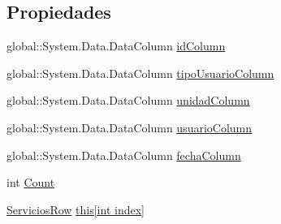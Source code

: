 \subsection*{Propiedades}
\begin{DoxyCompactItemize}
\item 
global\-::\-System.\-Data.\-Data\-Column \hyperlink{class_proyecto___integrador__3_1_1ds_servicios_1_1_servicios_data_table_a238b98b486c4eb6077f5eb1d26596f26}{id\-Column}
\item 
global\-::\-System.\-Data.\-Data\-Column \hyperlink{class_proyecto___integrador__3_1_1ds_servicios_1_1_servicios_data_table_a3ce967e456559fdf973c0efc3b70df96}{tipo\-Usuario\-Column}
\item 
global\-::\-System.\-Data.\-Data\-Column \hyperlink{class_proyecto___integrador__3_1_1ds_servicios_1_1_servicios_data_table_ab0e7d5e73c91967ce47805cbefda5db3}{unidad\-Column}
\item 
global\-::\-System.\-Data.\-Data\-Column \hyperlink{class_proyecto___integrador__3_1_1ds_servicios_1_1_servicios_data_table_ad22d89a1b9164d0edfee2ab6580bd23a}{usuario\-Column}
\item 
global\-::\-System.\-Data.\-Data\-Column \hyperlink{class_proyecto___integrador__3_1_1ds_servicios_1_1_servicios_data_table_afc3e8d1e9b39b8a278418310fadc37e1}{fecha\-Column}
\item 
int \hyperlink{class_proyecto___integrador__3_1_1ds_servicios_1_1_servicios_data_table_a2e0a353b5ce0c1a3718e78927b5a180c}{Count}
\item 
\hyperlink{class_proyecto___integrador__3_1_1ds_servicios_1_1_servicios_row}{Servicios\-Row} \hyperlink{class_proyecto___integrador__3_1_1ds_servicios_1_1_servicios_data_table_a24dd699ba58bb68edc2ca72efa463890}{this\mbox{[}int index\mbox{]}}
\end{DoxyCompactItemize}
